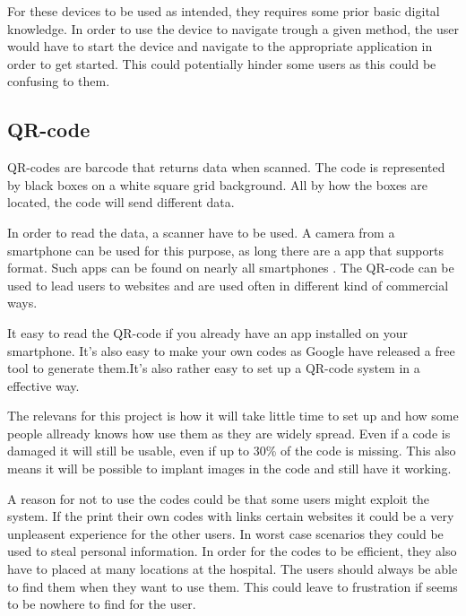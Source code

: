 For these devices to be used as intended, they requires some prior basic digital knowledge. In order to use the device to navigate trough a given method, the user would have to start the device and navigate to the appropriate application in order to get started. This could potentially hinder some users as this could be confusing to them.



\subsection{QR-code} %


QR-codes are barcode that returns data when scanned. The code is represented by black boxes on a white square grid background. All by how the boxes are located, the code will send different data.

In order to read the data, a scanner have to be used. A camera from a smartphone can be used for this purpose, as long there are a app that supports format. Such apps can be found on nearly all smartphones \cite{QR_smart}. The QR-code can be used to lead users to websites and are used often in different kind of commercial ways\cite{QR_url}.

It easy to read the QR-code if you already have an app installed on your smartphone. It's also easy to make your own codes as Google have released a free tool to generate them\cite{QR_Google}.It's also rather easy to set up a QR-code system in a effective way\cite{QR_easy}.

The relevans for this project is how it will take little time to set up\cite{QR_rel1} and how some people allready knows how use them as they are widely spread\cite{QR_spread}. Even if a code is damaged it will still be usable, even if up to 30\% of the code is missing\cite{QR_dama}. This also means it will be possible to implant images in the code and still have it working\cite{QR_image}.

A reason for not to use the codes could be that some users might exploit the system. If the print their own codes with links certain websites it could be a very unpleasent experience for the other users\cite{QR_urlbad}. In worst case scenarios they could be used to steal personal information\cite{QR_information}.
In order for the codes to be efficient, they also have to placed at many locations at the hospital. The users should always be able to find them when they want to use them. This could leave to frustration if seems to be nowhere to find for the user.